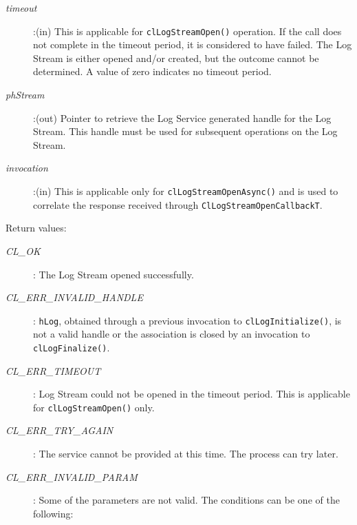 \begin{flushleft}
\begin{Desc}
\begin{description}
\item[{\em timeout}]:(in) This is applicable for {\tt{clLogStreamOpen()}} operation. If the call does not complete in the timeout period, it is 
considered to have failed. The Log Stream is either opened and/or created, but the outcome cannot be determined. A value of zero indicates
no timeout period.

\item[{\em phStream}]:(out) Pointer to retrieve the Log Service generated handle for the Log Stream. This handle must be used for subsequent operations on 
the Log Stream.

\item[{\em invocation}]:(in) This is applicable only for {\tt{clLogStreamOpenAsync()}} and is used to correlate the response received through 
{\tt{ClLogStreamOpenCallbackT}}.

\end{description}
\end{Desc}

\begin{Desc}
\item[Return values:]
\begin{description}

\item[{\em CL\_\-OK}]: The Log Stream opened successfully.

\item[{\em CL\_\-ERR\_\-INVALID\_\-HANDLE}]: {\tt{hLog}}, obtained through a previous invocation to 
{\tt{clLogInitialize()}}, is not a valid handle or the association is closed by an invocation to {\tt{clLogFinalize()}}.

\item[{\em CL\_\-ERR\_\-TIMEOUT}]: Log Stream could not be opened in the timeout period. This is applicable for {\tt{clLogStreamOpen()}} only.

\item[{\em CL\_\-ERR\_\-TRY\_\-AGAIN}]: The service cannot be provided at this time. The process can try later.

\item[{\em CL\_\-ERR\_\-INVALID\_\-PARAM}]: Some of the parameters are not valid. The conditions can be one of the following:


\end{description}
\end{Desc}
\end{flushleft}
